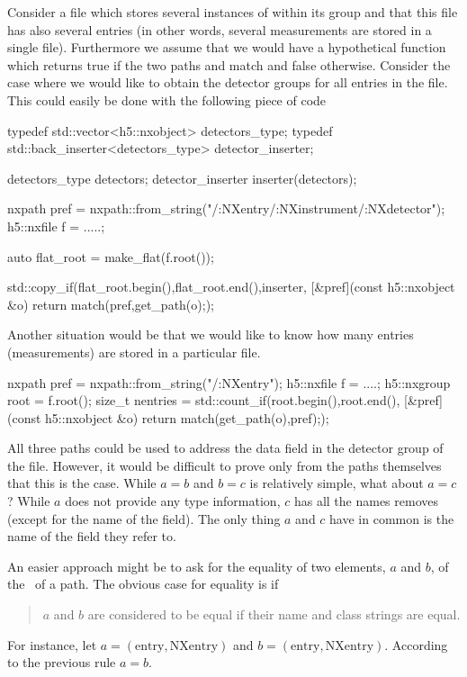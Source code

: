 Consider a file which stores several instances of  within its 
 group and that this file has also several entries (in other
words, several measurements are stored in a single file). 
Furthermore we assume that we would have a
hypothetical function  which 
returns true if the two paths  and  match and false otherwise. 
Consider the case where we would like to obtain the detector groups for all
entries in the file. This could easily be done with the following piece of code
\begin{cppcode}
typedef std::vector<h5::nxobject> detectors_type;
typedef std::back_inserter<detectors_type> detector_inserter; 

detectors_type detectors;
detector_inserter inserter(detectors);

nxpath pref = nxpath::from_string("/:NXentry/:NXinstrument/:NXdetector");
h5::nxfile f = .....;

auto flat_root = make_flat(f.root());

std::copy_if(flat_root.begin(),flat_root.end(),inserter,
             [&pref](const h5::nxobject &o) { return match(pref,get_path(o);});
\end{cppcode}
Another situation would be that we would like to know how many entries
(measurements) are stored in a particular file. 
\begin{cppcode}
nxpath pref = nxpath::from_string("/:NXentry");
h5::nxfile  f = ....;
h5::nxgroup root = f.root();
size_t nentries = std::count_if(root.begin(),root.end(),
                                [&pref](const h5::nxobject &o) 
                                {return match(get_path(o),pref);});
\end{cppcode}

All three paths could be used to address the 
data field in the detector group of the file. However, it would be difficult to 
prove only from the paths themselves that this is the case. While $a=b$ and
$b=c$ is relatively simple, what about $a=c$? While $a$ does not provide 
any type information, $c$ has all the names removes (except for the name of the
field). The only thing $a$ and $c$ have in common is the name of the field 
they refer to.

An easier approach might be to ask for the equality of two elements, $a$ and
$b$, of the 
\osection\ of a path. The obvious case for equality is if 
\begin{quote}
    $a$ and $b$ are considered to be equal if their name and class strings are
    equal. 
\end{quote}
For instance, let $a=(\mathrm{entry},\mathrm{NXentry})$ and
$b=(\mathrm{entry},\mathrm{NXentry})$. According to the previous rule $a=b$.

